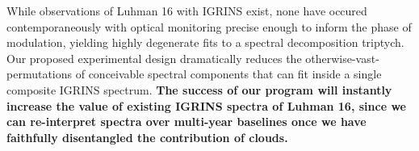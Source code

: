 \documentclass[11pt]{article}
\begin{document}
{%


\bandthreeplan




\classicalbackup




\justifyduplications

While observations of Luhman 16 with IGRINS exist, none have occured contemporaneously with optical monitoring precise enough to inform the phase of modulation, yielding highly degenerate fits to a spectral decomposition triptych.  Our proposed experimental design dramatically reduces the otherwise-vast-permutations of conceivable spectral components that can fit inside a single composite IGRINS spectrum.  \textbf{The success of our program will instantly increase the value of existing IGRINS spectra of Luhman 16, since we can re-interpret spectra over multi-year baselines once we have faithfully disentangled the contribution of clouds.}

}
\end{document}

